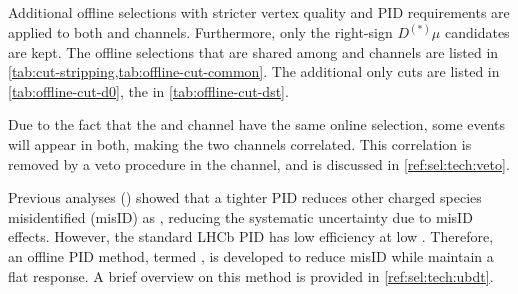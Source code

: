 Additional offline selections with stricter vertex quality and PID requirements
are applied to both \Dz and \Dstar channels.
Furthermore, only the right-sign $D^{(*)}\mu$ candidates are kept.
The offline selections that are shared among \Dz and \Dstar channels are listed
in \cref{tab:cut-stripping,tab:offline-cut-common}.
The additional \Dz only cuts are listed in \cref{tab:offline-cut-d0},
the \Dstar in \cref{tab:offline-cut-dst}.

Due to the fact that the \Dz and \Dstar channel have the same online selection,
some events will appear in both,
making the two channels correlated.
This correlation is removed by a \Dstar veto procedure in the \Dz channel,
and is discussed in \cref{ref:sel:tech:veto}.

Previous analyses (\cite{PhysRevLett.115.111803,LHCb-ANA-2020-056})
showed that a tighter \muon PID reduces other charged species misidentified
(misID) as \muon, reducing the systematic uncertainty due to misID effects.
However, the standard LHCb \muon PID has low efficiency at low \pt.
Therefore, an offline \muon PID method, termed \UBDT, is developed to reduce
misID while maintain a flat \pt response.
A brief overview on this method is provided in \cref{ref:sel:tech:ubdt}.


